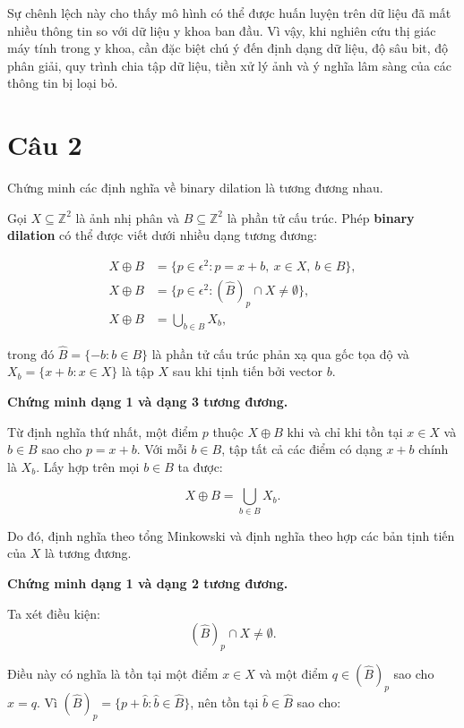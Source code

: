 Sự chênh lệch này cho thấy mô hình có thể được huấn luyện trên dữ liệu đã mất nhiều thông tin so với dữ liệu y khoa ban đầu. Vì vậy, khi nghiên cứu thị giác máy tính trong y khoa, cần đặc biệt chú ý đến định dạng dữ liệu, độ sâu bit, độ phân giải, quy trình chia tập dữ liệu, tiền xử lý ảnh và ý nghĩa lâm sàng của các thông tin bị loại bỏ.

\section*{Câu 2}
Chứng minh các định nghĩa về binary dilation là tương đương nhau.

Gọi $X \subseteq \mathbb{Z}^2$ là ảnh nhị phân và $B \subseteq \mathbb{Z}^2$ là phần tử cấu trúc. Phép \textbf{binary dilation} có thể được viết dưới nhiều dạng tương đương:

\begin{align}
    X \oplus B
    &= \{p \in \epsilon^2 : p = x + b,\ x \in X,\ b \in B\}, \\
    X \oplus B
    &= \{p \in \epsilon^2 : (\hat{B})_p \cap X \neq \emptyset\}, \\
    X \oplus B
    &= \bigcup_{b \in B} X_b,
\end{align}

trong đó $\hat{B}=\{-b:b\in B\}$ là phần tử cấu trúc phản xạ qua gốc tọa độ và $X_b=\{x+b:x\in X\}$ là tập $X$ sau khi tịnh tiến bởi vector $b$.

\textbf{Chứng minh dạng 1 và dạng 3 tương đương.}

Từ định nghĩa thứ nhất, một điểm $p$ thuộc $X \oplus B$ khi và chỉ khi tồn tại $x\in X$ và $b\in B$ sao cho $p=x+b$. Với mỗi $b\in B$, tập tất cả các điểm có dạng $x+b$ chính là $X_b$. Lấy hợp trên mọi $b\in B$ ta được:

\begin{equation}
    X \oplus B = \bigcup_{b \in B} X_b.
\end{equation}

Do đó, định nghĩa theo tổng Minkowski và định nghĩa theo hợp các bản tịnh tiến của $X$ là tương đương.

\textbf{Chứng minh dạng 1 và dạng 2 tương đương.}

Ta xét điều kiện:
\begin{equation}
    (\hat{B})_p \cap X \neq \emptyset.
\end{equation}

Điều này có nghĩa là tồn tại một điểm $x\in X$ và một điểm $q\in (\hat{B})_p$ sao cho $x=q$. Vì $(\hat{B})_p=\{p+\hat{b}:\hat{b}\in\hat{B}\}$, nên tồn tại $\hat{b}\in\hat{B}$ sao cho:

